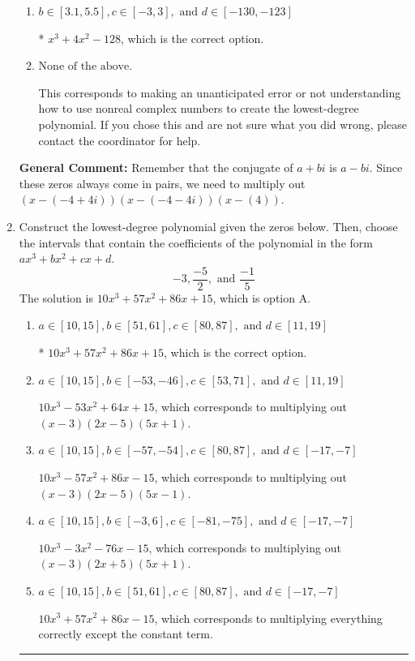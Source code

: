 \documentclass{extbook}[14pt]
\newcommand{\litem}[1]{\item #1

\rule{\textwidth}{0.4pt}}
\begin{document}
\begin{enumerate}
{\begin{enumerate}[label=\Alph*.]
$x^{3} -4 x^{2} + 128$, which corresponds to multiplying out $(x-(-4 + 4 i))(x-(-4 - 4 i))(x + 4)$.
\item \( b \in [3.1, 5.5], c \in [-3, 3], \text{ and } d \in [-130, -123] \)

* $x^{3} +4 x^{2} -128$, which is the correct option.
\item \( \text{None of the above.} \)

This corresponds to making an unanticipated error or not understanding how to use nonreal complex numbers to create the lowest-degree polynomial. If you chose this and are not sure what you did wrong, please contact the coordinator for help.
\end{enumerate}

\textbf{General Comment:} Remember that the conjugate of $a+bi$ is $a-bi$. Since these zeros always come in pairs, we need to multiply out $(x-(-4 + 4 i))(x-(-4 - 4 i))(x-(4))$.
}
\litem{
Construct the lowest-degree polynomial given the zeros below. Then, choose the intervals that contain the coefficients of the polynomial in the form $ax^3+bx^2+cx+d$.
\[ -3, \frac{-5}{2}, \text{ and } \frac{-1}{5} \]The solution is \( 10x^{3} +57 x^{2} +86 x + 15 \), which is option A.\begin{enumerate}[label=\Alph*.]
\item \( a \in [10, 15], b \in [51, 61], c \in [80, 87], \text{ and } d \in [11, 19] \)

* $10x^{3} +57 x^{2} +86 x + 15$, which is the correct option.
\item \( a \in [10, 15], b \in [-53, -46], c \in [53, 71], \text{ and } d \in [11, 19] \)

$10x^{3} -53 x^{2} +64 x + 15$, which corresponds to multiplying out $(x -3)(2x -5)(5x + 1)$.
\item \( a \in [10, 15], b \in [-57, -54], c \in [80, 87], \text{ and } d \in [-17, -7] \)

$10x^{3} -57 x^{2} +86 x -15$, which corresponds to multiplying out $(x -3)(2x -5)(5x -1)$.
\item \( a \in [10, 15], b \in [-3, 6], c \in [-81, -75], \text{ and } d \in [-17, -7] \)

$10x^{3} -3 x^{2} -76 x -15$, which corresponds to multiplying out $(x -3)(2x + 5)(5x + 1)$.
\item \( a \in [10, 15], b \in [51, 61], c \in [80, 87], \text{ and } d \in [-17, -7] \)

$10x^{3} +57 x^{2} +86 x -15$, which corresponds to multiplying everything correctly except the constant term.
\end{enumerate}

}
\end{enumerate}
\end{document}
